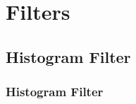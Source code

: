 \documentclass[letterpaper,10pt,english]{sphinxmanual}
\begin{document}
\section{Filters}
\label{\detokenize{Filters:filters}}\label{\detokenize{Filters::doc}}

\subsection{Histogram Filter}
\label{\detokenize{Filters:histogram-filter}}
\sphinxstepscope


\subsubsection{Histogram Filter}
\label{\detokenize{HF:histogram-filter}}\label{\detokenize{HF::doc}}
\begin{figure}[htbp]
\centering

\noindent{}
\end{figure}
\end{document}
